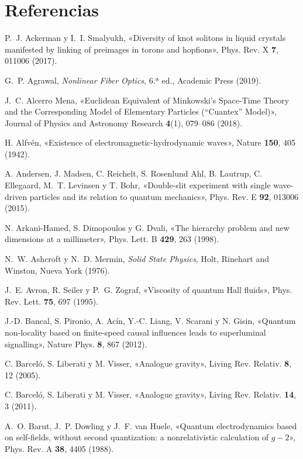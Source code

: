 \documentclass[11pt,a4paper]{article}
\begin{document}
\section*{Referencias}

\begin{list}{}{\setlength{\leftmargin}{1.5em}\setlength{\itemindent}{-1.5em}\setlength{\itemsep}{0.15em}\small}
\item P.~J. Ackerman y I.~I. Smalyukh, «Diversity of knot solitons in liquid crystals manifested by linking of preimages in torons and hopfions», Phys. Rev. X \textbf{7}, 011006 (2017).
\item G.~P. Agrawal, \emph{Nonlinear Fiber Optics}, 6.ª ed., Academic Press (2019).
\item J.~C. Alcerro Mena, «Euclidean Equivalent of Minkowski's Space-Time Theory and the Corresponding Model of Elementary Particles (“Cuantex” Model)», Journal of Physics and Astronomy Research \textbf{4}(1), 079--086 (2018).
\item H. Alfvén, «Existence of electromagnetic-hydrodynamic waves», Nature \textbf{150}, 405 (1942).
\item A. Andersen, J. Madsen, C. Reichelt, S. Rosenlund Ahl, B. Lautrup, C. Ellegaard, M.~T. Levinsen y T. Bohr, «Double-slit experiment with single wave-driven particles and its relation to quantum mechanics», Phys. Rev. E \textbf{92}, 013006 (2015).
\item N. Arkani-Hamed, S. Dimopoulos y G. Dvali, «The hierarchy problem and new dimensions at a millimeter», Phys. Lett. B \textbf{429}, 263 (1998).
\item N.~W. Ashcroft y N.~D. Mermin, \emph{Solid State Physics}, Holt, Rinehart and Winston, Nueva York (1976).
\item J.~E. Avron, R. Seiler y P.~G. Zograf, «Viscosity of quantum Hall fluids», Phys. Rev. Lett. \textbf{75}, 697 (1995).
\item J.-D. Bancal, S. Pironio, A. Acín, Y.-C. Liang, V. Scarani y N. Gisin, «Quantum non-locality based on finite-speed causal influences leads to superluminal signalling», Nature Phys. \textbf{8}, 867 (2012).
\item C. Barceló, S. Liberati y M. Visser, «Analogue gravity», Living Rev. Relativ. \textbf{8}, 12 (2005).
\item C. Barceló, S. Liberati y M. Visser, «Analogue gravity», Living Rev. Relativ. \textbf{14}, 3 (2011).
\item A.~O. Barut, J.~P. Dowling y J.~F. van Huele, «Quantum electrodynamics based on self-fields, without second quantization: a nonrelativistic calculation of $g-2$», Phys. Rev. A \textbf{38}, 4405 (1988).

\end{list}
\end{document}
